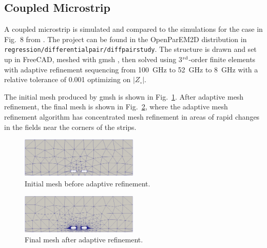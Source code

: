 \documentclass[titlepage]{article}
\renewcommand\_{\textunderscore\linebreak[1]}
\begin{document}
\subsection{Coupled Microstrip}

A coupled microstrip is simulated and compared to the simulations for the case in Fig.~8 from \cite{Olyslager}.  The project can be found in the OpenParEM2D distribution in \texttt{regression/differential\_pair/diff\_pair\_study}.  The structure is drawn and set up in FreeCAD, meshed with gmsh \cite{gmsh}\cite{gmshweb}, then solved using 3$^{\textnormal{rd}}$-order finite elements with adaptive refinement sequencing from 100~GHz to 52~GHz to 8~GHz with a relative tolerance of 0.001 optimizing on $|Z_{\circ}|$.

The initial mesh produced by gmsh is shown in Fig.~\ref{fig:diffpair_initial_mesh}.  After adaptive mesh refinement, the final mesh is shown in Fig.~\ref{fig:diffpair_optimized_mesh}, where the adaptive mesh refinement algorithm has concentrated mesh refinement in areas of rapid changes in the fields near the corners of the strips.
\begin{figure}[H]
  \centering
  \includegraphics[width=0.5\textwidth]{../regression/OpenParEM2D/differential_pair/diff_pair_study/screenshots/diffpair_initial_mesh}
  \caption{Initial mesh before adaptive refinement.}
  \label{fig:diffpair_initial_mesh}
\end{figure}
\begin{figure}[H]
  \centering
  \includegraphics[width=0.5\textwidth]{../regression/OpenParEM2D/differential_pair/diff_pair_study/screenshots/diffpair_optimized_mesh}
  \caption{Final mesh after adaptive refinement.}
  \label{fig:diffpair_optimized_mesh}
\end{figure}
\end{document}
